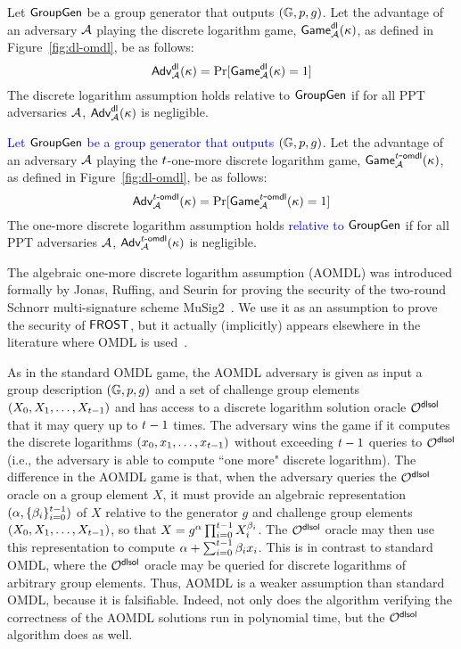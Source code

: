 \begin{assumption}\label{ass:dl}
Let $\mathsf{GroupGen}$ be a group generator that outputs $(\mathbb{G}, p, g)$.
Let the advantage of an adversary $\mathcal{A}$ playing the discrete logarithm game,
$\mathsf{Game}^{\mathsf{dl}}_{\mathcal{A}}(\kappa)$, as defined in Figure~\ref{fig:dl-omdl}, be as follows:
%
\[
  \textsf{Adv}^{\textrm{$\mathsf{dl}$}}_{\mathcal{A}}(\kappa) = \Pr[\mathsf{Game}^{\mathsf{dl}}_{\mathcal{A}}(\kappa) = 1]
\]
%
The discrete logarithm assumption holds relative to $\mathsf{GroupGen}$ if for all PPT adversaries $\mathcal{A}$,
$\textsf{Adv}^{\textrm{$\mathsf{dl}$}}_{\mathcal{A}}(\kappa) $ is negligible.
\end{assumption}

\begin{assumption}\label{ass:omdl}
\emph{\cite{BellareNPS03}}
\textcolor{blue}{Let $\mathsf{GroupGen}$ be a group generator that outputs $(\mathbb{G}, p, g)$.}
Let the advantage of an adversary $\mathcal{A}$ playing the $t$-one-more discrete logarithm game,
$\mathsf{Game}^{t\hbox{-}\mathsf{omdl}}_{\mathcal{A}}(\kappa)$, as defined in Figure~\ref{fig:dl-omdl}, be as follows:
%
\[
  \textsf{Adv}^{\textrm{$t\hbox{-}\mathsf{omdl}$}}_{\mathcal{A}}(\kappa) = \Pr[\mathsf{Game}^{t\hbox{-}\mathsf{omdl}}_{\mathcal{A}}(\kappa) = 1]
\]
%
The one-more discrete logarithm assumption holds \textcolor{blue}{relative to $\mathsf{GroupGen}$} if for all PPT adversaries $\mathcal{A}$,
$\textsf{Adv}^{\textrm{$t\hbox{-}\mathsf{omdl}$}}_{\mathcal{A}}(\kappa) $ is negligible.
\end{assumption}
%
The algebraic one-more discrete logarithm assumption (AOMDL) was introduced formally by Jonas, Ruffing, and Seurin for proving the security of the two-round Schnorr multi-signature scheme MuSig2~\cite{NickRS21}.
We use it as an assumption to prove the security of $\mathsf{FROST}$, but it actually (implicitly) appears elsewhere in the literature where OMDL is used~\cite{BellareP02,NicolosiKDM03,BellareS07,FuchsbauerPS20}.

As in the standard  OMDL game, the AOMDL adversary is given as input a group description $(\mathbb{G}, p , g)$ and a set of challenge group elements $(X_0, X_1, \dots, X_{t-1})$ and has access to a discrete logarithm solution oracle $\mathcal{O}^{\mathsf{dlsol}}$ that it may query up to $t-1$ times.
The adversary wins the game if it computes the discrete logarithms $(x_0, x_1, \dots, x_{t-1})$ without exceeding $t-1$ queries to $\mathcal{O}^{\mathsf{dlsol}}$ (i.e., the adversary is able to compute ``one more" discrete logarithm).
The difference in the AOMDL game is that, when the adversary queries the $\mathcal{O}^{\mathsf{dlsol}}$ oracle on a group element $X$, it must provide an algebraic representation $(\alpha, \{ \beta_i \}_{i=0}^{t-1})$ of $X$ relative to the generator $g$ and challenge group elements $(X_0, X_1, \dots, X_{t-1})$,
so that $X = g^{\alpha} \prod_{i=0}^{t-1} X_i^{\beta_i}$.
The $\mathcal{O}^{\mathsf{dlsol}}$ oracle may then use this representation to compute $\alpha + \sum_{i=0}^{t-1} \beta_i x_i$.
This is in contrast to standard OMDL, where the $\mathcal{O}^{\mathsf{dlsol}}$ oracle may be queried for discrete logarithms of arbitrary group elements.
Thus, AOMDL is a weaker assumption than standard OMDL, because it is falsifiable.
Indeed, not only does the algorithm verifying the correctness of the AOMDL solutions run in polynomial time, but the $\mathcal{O}^{\mathsf{dlsol}}$ algorithm does as well.


